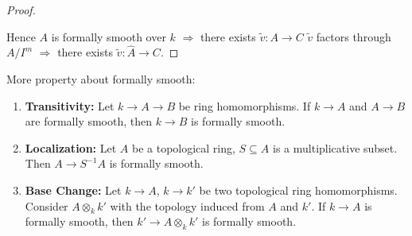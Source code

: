 \documentclass[cs4size]{article}
\newcommand{\su}{\subseteq}
\newcommand{\inv}{^{-1}}
\newcommand{\ra}{\rightarrow}
\newcommand{\Ra}{\Rightarrow}
\begin{document}
\begin{enumerate}
\begin{proof}
    \begin{center}
    \end{center}
    Hence $A$ is formally smooth over $k$ $\Ra$ there exists $\tilde{v}: A\ra C$ $\tilde{v}$ factors through $A/I^m$ $\Ra$ there exists $\tilde{v}: \hat{A}\ra C$.
    \end{proof}
\end{enumerate}

More property about formally smooth:
\begin{enumerate}
\item \textbf{Transitivity: }Let $k\ra A\ra B$ be ring homomorphisms. If $k\ra A$ and $A\ra B$ are formally smooth, then $k\ra B$ is formally smooth.
\item \textbf{Localization: }Let $A$ be a topological ring, $S\su A$ is a multiplicative subset. Then $A\ra S\inv A$ is formally smooth.
\item \textbf{Base Change: }Let $k\ra A$, $k\ra k'$ be two topological ring homomorphisms. Consider $A\otimes_kk'$ with the topology induced from $A$ and $k'$. If $k\ra A$ is formally smooth, then $k'\ra A\otimes_kk'$ is formally smooth.
\end{enumerate}
\end{document}
